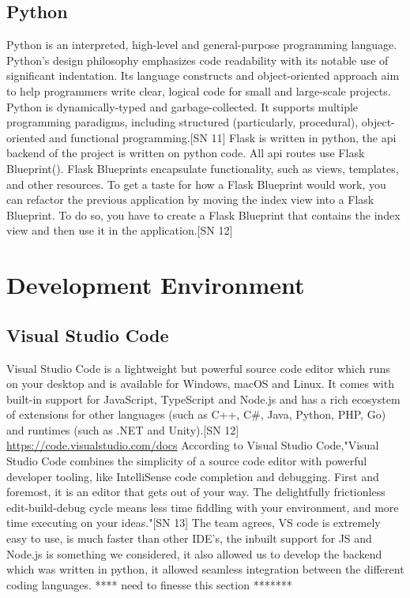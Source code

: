 \subsection{Python}
Python is an interpreted, high-level and general-purpose programming language. Python's design philosophy emphasizes code readability with its notable use of significant indentation. Its language constructs and object-oriented approach aim to help programmers write clear, logical code for small and large-scale projects.
Python is dynamically-typed and garbage-collected. It supports multiple programming paradigms, including structured (particularly, procedural), object-oriented and functional programming.[SN 11]
Flask is written in python, the api backend of the project is written on python code. All api routes use Flask Blueprint().
Flask Blueprints encapsulate functionality, such as views, templates, and other resources. To get a taste for how a Flask Blueprint would work, you can refactor the previous application by moving the index view into a Flask Blueprint. To do so, you have to create a Flask Blueprint that contains the index view and then use it in the application.[SN 12]

\section{Development Environment}
\subsection{Visual Studio Code}
Visual Studio Code is a lightweight but powerful source code editor which runs on your desktop and is available for Windows, macOS and Linux. It comes with built-in support for JavaScript, TypeScript and Node.js and has a rich ecosystem of extensions for other languages (such as C++, C\#, Java, Python, PHP, Go) and runtimes (such as .NET and Unity).[SN 12] \url{https://code.visualstudio.com/docs}
According to Visual Studio Code,"Visual Studio Code combines the simplicity of a source code editor with powerful developer tooling, like IntelliSense code completion and debugging.
First and foremost, it is an editor that gets out of your way. The delightfully frictionless edit-build-debug cycle means less time fiddling with your environment, and more time executing on your ideas."[SN 13]
The team agrees, VS code is extremely easy to use, is much faster than other IDE's, the inbuilt support for JS and Node.js is something we considered, it also allowed us to develop the backend which was written in python, it allowed seamless integration between the different coding languages. **** need to finesse this section *******


